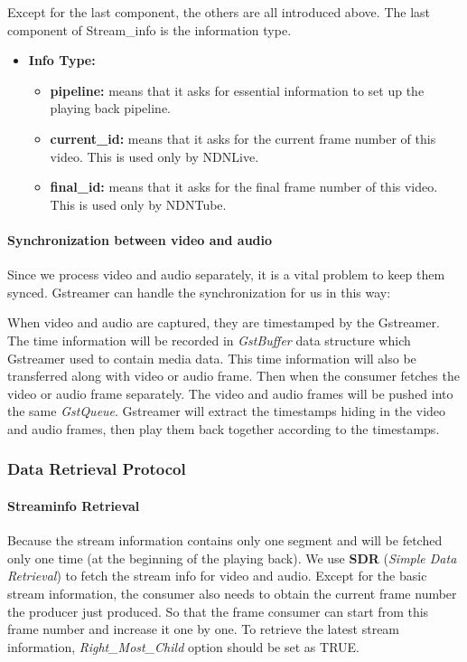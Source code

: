 Except for the last component, the others are all introduced above. The last component of Stream\_info is the information type.
\begin{itemize}
  \item{\textbf{Info Type:}} 
  \begin{itemize}
    \item{\textbf{pipeline:}} means that it asks for essential information to set up the playing back pipeline. 
    \item{\textbf{current\_id:}} means that it asks for the current frame number of this video. This is used only by NDNLive.
    \item{\textbf{final\_id:}} means that it asks for the final frame number of this video. This is used only by NDNTube. 
  \end{itemize}
\end{itemize}

\paragraph {Synchronization between video and audio}
\label{par:sync}
Since we process video and audio separately, it is a vital problem to keep them synced. Gstreamer can handle the synchronization for us in this way:

When video and audio are captured, they are timestamped by the Gstreamer. The time information will be recorded in \textit{GstBuffer} data structure which Gstreamer used to contain media data. This time information will also be transferred along with video or audio frame. Then when the consumer fetches the video or audio frame separately. The video and audio frames will be pushed into the same \textit{GstQueue}. Gstreamer will extract the timestamps hiding in the video and audio frames, then play them back together according to the timestamps.

\subsubsection{Data Retrieval Protocol}
\paragraph{Streaminfo Retrieval} %
\label{par:streaminfo}
Because the stream information contains only one segment and will be fetched only one time (at the beginning of the playing back). We use \textbf{SDR} (\textit{Simple Data Retrieval}) to fetch the stream info for video and audio. Except for the basic stream information, the consumer also needs to obtain the current frame number the producer just produced. So that the frame consumer can start from this frame number and increase it one by one. To retrieve the latest stream information, \textit{Right\_Most\_Child} option should be set as TRUE.

